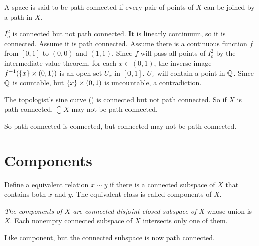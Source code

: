 \begin{definition}
    A space is said to be path connected if every pair of points of $X$ can be joined by a path in $X$.
\end{definition}


\begin{example}
    $I_o^2$ is connected but not path connected. It is linearly continuum, so it is connected. Assume it is path connected. Assume there is a continuous function $f$ from $[0,1]$ to $(0,0)$ and $(1,1)$. Since $f$ will pass all points of $I_o^2$ by the intermediate value theorem, for each $x \in (0,1)$, the inverse image ${f}^{-1}(\set{x} \times (0,1))$ is an open set $U_x$ in $[0,1]$. $U_x$ will contain a point in $\mathbb{Q}$. Since $\mathbb{Q}$ is countable, but $\set{x} \times (0,1)$ is uncountable, a contradiction.
\end{example}

\begin{example}
    The topologist's sine curve () is connected but not path connected. So if $X$ is path connected, $\closure{X}$ may not be path connected.
    
    So path connected is connected, but connected may not be path connected.
\end{example}





\section{Components}

\begin{definition}
    Define a equivalent relation $x \sim y$ if there is a connected subspace of $X$ that contains both $x$ and $y$. The equivalent class is called components of $X$.
\end{definition}

\begin{theorem}
\emph{The components of $X$ are connected disjoint closed subspace of $X$} whose union is $X$. Each nonempty connected subspace of $X$ intersects only one of them.    
\end{theorem}


\begin{definition}
    Like component, but the connected subspace is now path connected.
\end{definition}

